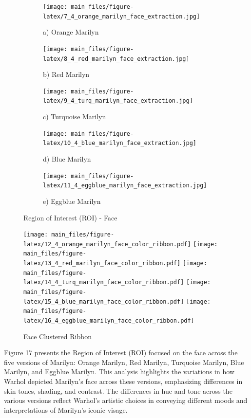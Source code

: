 \documentclass{article}
\begin{document}
\begin{figure}[htbp]
    \centering
    \begin{subfigure}[b]{0.19\textwidth}
        \texttt{[image: main\_files/figure-latex/7\_4\_orange\_marilyn\_face\_extraction.jpg]}
        \caption*{a) Orange Marilyn}
    \end{subfigure}
    \hfill
    \begin{subfigure}[b]{0.19\textwidth}
        \texttt{[image: main\_files/figure-latex/8\_4\_red\_marilyn\_face\_extraction.jpg]}
        \caption*{b) Red Marilyn}
    \end{subfigure}
    \hfill
    \begin{subfigure}[b]{0.19\textwidth}
        \texttt{[image: main\_files/figure-latex/9\_4\_turq\_marilyn\_face\_extraction.jpg]}
        \caption*{c) Turquoise Marilyn}
    \end{subfigure}
    \hfill
    \begin{subfigure}[b]{0.19\textwidth}
        \texttt{[image: main\_files/figure-latex/10\_4\_blue\_marilyn\_face\_extraction.jpg]}
        \caption*{d) Blue Marilyn}
    \end{subfigure}
    \hfill
    \begin{subfigure}[b]{0.19\textwidth}
        \texttt{[image: main\_files/figure-latex/11\_4\_eggblue\_marilyn\_face\_extraction.jpg]}
        \caption*{e) Eggblue Marilyn}
    \end{subfigure}
    
    \caption{Region of Interest (ROI) - Face}
\end{figure}

\begin{figure}[htbp]
    \centering
        {\texttt{[image: main\_files/figure-latex/12\_4\_orange\_marilyn\_face\_color\_ribbon.pdf]}}
        {\texttt{[image: main\_files/figure-latex/13\_4\_red\_marilyn\_face\_color\_ribbon.pdf]}}
        {\texttt{[image: main\_files/figure-latex/14\_4\_turq\_marilyn\_face\_color\_ribbon.pdf]}}
        {\texttt{[image: main\_files/figure-latex/15\_4\_blue\_marilyn\_face\_color\_ribbon.pdf]}}
        {\texttt{[image: main\_files/figure-latex/16\_4\_eggblue\_marilyn\_face\_color\_ribbon.pdf]}}
    \caption{Face Clustered Ribbon}
\end{figure}

Figure 17 presents the Region of Interest (ROI) focused on the face
across the five versions of Marilyn: Orange Marilyn, Red Marilyn,
Turquoise Marilyn, Blue Marilyn, and Eggblue Marilyn. This analysis
highlights the variations in how Warhol depicted Marilyn's face across
these versions, emphasizing differences in skin tones, shading, and
contrast. The differences in hue and tone across the various versions
reflect Warhol's artistic choices in conveying different moods and
interpretations of Marilyn's iconic visage.
\end{document}
